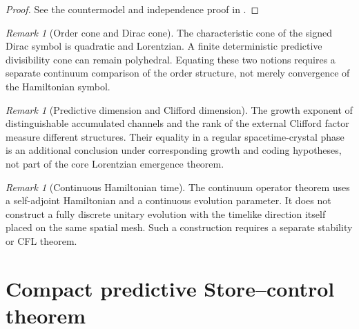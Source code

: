 \documentclass[11pt]{article}
\theoremstyle{definition}
\theoremstyle{remark}
\newtheorem{remark}[theorem]{Remark}
\begin{document}
\begin{proof}
See the countermodel and independence proof in .
\end{proof}

\begin{remark}[Order cone and Dirac cone]
The characteristic cone of the signed Dirac symbol is quadratic and Lorentzian.
A finite deterministic predictive divisibility cone can remain polyhedral.
Equating these two notions requires a separate continuum comparison of the
order structure, not merely convergence of the Hamiltonian symbol.
\end{remark}

\begin{remark}[Predictive dimension and Clifford dimension]
The growth exponent of distinguishable accumulated channels and the rank of the
external Clifford factor measure different structures.  Their equality in a
regular spacetime-crystal phase is an additional conclusion under corresponding
growth and coding hypotheses, not part of the core Lorentzian emergence theorem.
\end{remark}

\begin{remark}[Continuous Hamiltonian time]
The continuum operator theorem uses a self-adjoint Hamiltonian and a continuous
evolution parameter.  It does not construct a fully discrete unitary evolution
with the timelike direction itself placed on the same spatial mesh.  Such a
construction requires a separate stability or CFL theorem.
\end{remark}

\section{Compact predictive Store--control theorem}
\end{document}
